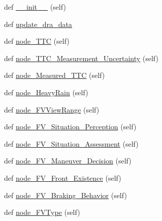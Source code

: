 \begin{DoxyCompactItemize}
\item 
def \hyperlink{classbayesian__network__config_1_1_bayesian_network_config_aeee7107b8b3f2b2cd42c3d57fb4235c3}{\+\_\+\+\_\+init\+\_\+\+\_\+} (self)
\item 
def \hyperlink{classbayesian__network__config_1_1_bayesian_network_config_a5324414961900ca2eede9cc160a24ff7}{update\+\_\+dra\+\_\+data}
\item 
def \hyperlink{classbayesian__network__config_1_1_bayesian_network_config_a49f488a98830cd4781609a426aab8f7c}{node\+\_\+\+T\+TC} (self)
\item 
def \hyperlink{classbayesian__network__config_1_1_bayesian_network_config_a813f87173ae162e2463b86d2fbf7f287}{node\+\_\+\+T\+T\+C\+\_\+\+Measurement\+\_\+\+Uncertainty} (self)
\item 
def \hyperlink{classbayesian__network__config_1_1_bayesian_network_config_a0aff21732724921c5b734e4cc2128711}{node\+\_\+\+Measured\+\_\+\+T\+TC} (self)
\item 
def \hyperlink{classbayesian__network__config_1_1_bayesian_network_config_a7e92e0763a594ce2d1ac0e6cf4ed6658}{node\+\_\+\+Heavy\+Rain} (self)
\item 
def \hyperlink{classbayesian__network__config_1_1_bayesian_network_config_a14bac441795a8f3c96df9342dff6ecc2}{node\+\_\+\+F\+V\+View\+Range} (self)
\item 
def \hyperlink{classbayesian__network__config_1_1_bayesian_network_config_aa4e512eed678233616fbc648e8a5d973}{node\+\_\+\+F\+V\+\_\+\+Situation\+\_\+\+Perception} (self)
\item 
def \hyperlink{classbayesian__network__config_1_1_bayesian_network_config_a73e6055c566983256fceb8f6c587d20a}{node\+\_\+\+F\+V\+\_\+\+Situation\+\_\+\+Assessment} (self)
\item 
def \hyperlink{classbayesian__network__config_1_1_bayesian_network_config_aa63fd1483c8ff02d6bc7c9482a59cad5}{node\+\_\+\+F\+V\+\_\+\+Maneuver\+\_\+\+Decision} (self)
\item 
def \hyperlink{classbayesian__network__config_1_1_bayesian_network_config_afe1f290bda7493ebf0098c0c69ec267b}{node\+\_\+\+F\+V\+\_\+\+Front\+\_\+\+Existence} (self)
\item 
def \hyperlink{classbayesian__network__config_1_1_bayesian_network_config_a424061edb518c981c0e1ceed918a6d2f}{node\+\_\+\+F\+V\+\_\+\+Braking\+\_\+\+Behavior} (self)
\item 
def \hyperlink{classbayesian__network__config_1_1_bayesian_network_config_a7f212c99308978eef668419727075a07}{node\+\_\+\+F\+V\+Type} (self)

\end{DoxyCompactItemize}
